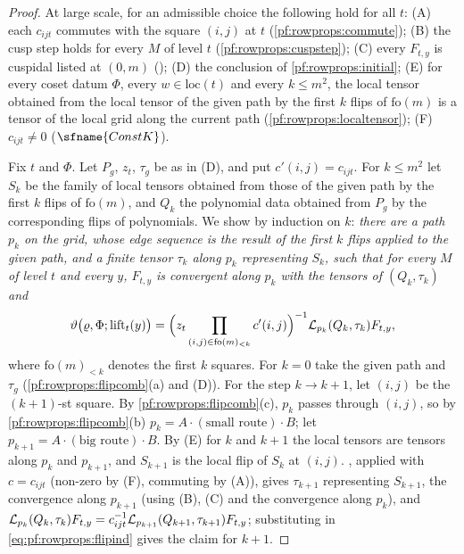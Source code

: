 \begin{proof}
At large scale, for an admissible choice the following hold for all $t$: (A) each $c_{ijt}$ commutes with the square
$(i,j)$ at $t$ (\cref{pf:rowprops:commute}); (B) the cusp step holds for every $M$ of level $t$
(\cref{pf:rowprops:cuspstep}); (C) every $F_{t,y}$ is cuspidal listed at $(0,m)$
(); (D) the conclusion of \cref{pf:rowprops:initial}; (E) for every
coset datum $\Phi$, every $w\in\mathrm{loc}(t)$ and every $k\le m^2$, the local tensor obtained from the local tensor of
the given path by the first $k$ flips of $\mathrm{fo}(m)$ is a tensor of the local grid along the current path
(\cref{pf:rowprops:localtensor}); (F) $c_{ijt}\ne0$ ($\sfname{ConstK}$).

Fix $t$ and $\Phi$. Let $P_g$, $z_t$, $\tau_g$ be as in (D), and put $c'(i,j)=c_{ijt}$. For $k\le m^2$ let $S_k$ be the family of
local tensors obtained from those of the given path by the first $k$ flips of $\mathrm{fo}(m)$, and $Q_k$ the polynomial
data obtained from $P_g$ by the corresponding flips of polynomials. We show by induction on $k$: \emph{there are a path $p_k$
on the grid, whose edge sequence is the result of the first $k$ flips applied to the given path, and a finite tensor
$\tau_k$ along $p_k$ representing $S_k$, such that for every $M$ of level $t$ and every $y$, $F_{t,y}$ is convergent along
$p_k$ with the tensors of $(Q_k,\tau_k)$ and}
\begin{equation}\label{eq:pf:rowprops:flipind}
\vartheta\bigl(\varrho,\Phi;\mathrm{lift}_t(y)\bigr)=\Bigl(z_t\prod_{(i,j)\in\mathrm{fo}(m)_{<k}}c'(i,j)\Bigr)^{-1}
\mathcal{L}_{p_k}(Q_k,\tau_k)F_{t,y},
\end{equation}
where $\mathrm{fo}(m)_{<k}$ denotes the first $k$ squares. For $k=0$ take the given path and $\tau_g$ (\cref{pf:rowprops:flipcomb}(a)
and (D)). For the step $k\to k+1$, let $(i,j)$ be the $(k+1)$-st square. By \cref{pf:rowprops:flipcomb}(c), $p_k$ passes
through $(i,j)$, so by \cref{pf:rowprops:flipcomb}(b) $p_k=A\cdot(\text{small route})\cdot B$; let $p_{k+1}=A\cdot(\text{big
route})\cdot B$. By (E) for $k$ and $k+1$ the local tensors are tensors along $p_k$ and $p_{k+1}$, and $S_{k+1}$ is the local
flip of $S_k$ at $(i,j)$. , applied with $c=c_{ijt}$ (non-zero by (F), commuting by (A)), gives
$\tau_{k+1}$ representing $S_{k+1}$, the convergence along $p_{k+1}$ (using (B), (C) and the convergence along $p_k$), and
$\mathcal{L}_{p_k}(Q_k,\tau_k)F_{t,y}=c_{ijt}^{-1}\mathcal{L}_{p_{k+1}}(Q_{k+1},\tau_{k+1})F_{t,y}$; substituting in
\eqref{eq:pf:rowprops:flipind} gives the claim for $k+1$.


\end{proof}

